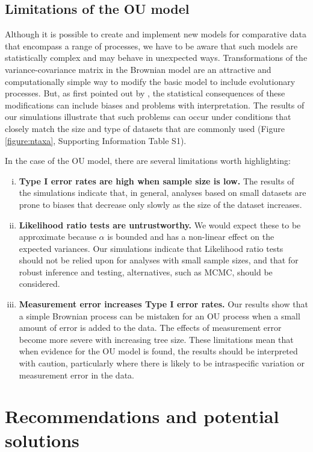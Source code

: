 \documentclass[a4paper,12pt]{article}
\begin{document}
  \subsection{Limitations of the OU model}
  Although it is possible to create and implement new models for comparative data that encompass a range of processes, we have to be aware that such models are statistically complex and may behave in unexpected ways. 
  Transformations of the variance-covariance matrix in the Brownian model \citep[e.g. $\lambda$;][]{Pagel:1997aa} are an attractive and computationally simple way to modify the basic model to include evolutionary processes. 
  But, as first pointed out by \citet{grafen1989phylogenetic}, the statistical consequences of these modifications can include biases and problems with interpretation. 
  The results of our simulations illustrate that such problems can occur under conditions that closely match the size and type of datasets that are commonly used (Figure \ref{figure:ntaxa}, Supporting Information Table S1).
  
  In the case of the OU model, there are several limitations worth highlighting:
\begin{enumerate}[(i)]
  \item \textbf{Type I error rates are high when sample size is low.} 
  The results of the simulations indicate that, in general, analyses based on small datasets are prone to biases that decrease only slowly as the size of the dataset increases.  
  \item \textbf{Likelihood ratio tests are untrustworthy.}
  We would expect these to be approximate because $\alpha$ is bounded and has a non-linear effect on the expected variances. 
  Our simulations indicate that Likelihood ratio tests should not be relied upon for analyses with small sample sizes, and that for robust inference and testing, alternatives, such as MCMC, should be considered. 
  \item \textbf{Measurement error increases Type I error rates.} 
  Our results show that a simple Brownian process can be mistaken for an OU process when a small amount of error is added to the data. 
  The effects of measurement error become more severe with increasing tree size.
  These limitations mean that when evidence for the OU model is found, the results should be interpreted with caution, particularly where there is likely to be intraspecific variation or measurement error in the data.
\end{enumerate}

\section{Recommendations and potential solutions}
\end{document}
